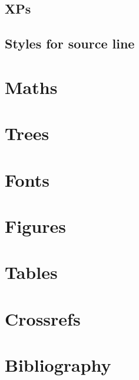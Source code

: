 \documentclass[output=book
  ,colorlinks
  ,showindex
  ,draftmode
  ,openreview
  ,nobabel
  ,booklanguage=italian
  ,oldstylenumbers
  ,multiauthors
  ,biblatex
  ,tblseight
  ]{langscibook}
\begin{document}
\subsection{XPs}




\subsection{Styles for source line}




% 

\section{Maths}


\section{Trees}


\section{Fonts}

% 


\section{Figures}\label{sec:tables}

\section{Tables}\label{sec:tables}


\section{Crossrefs}


\section{Bibliography}

% 
\end{document}
